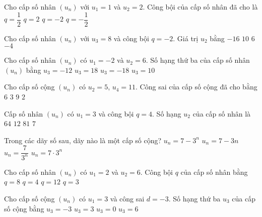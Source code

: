 \begin{ex}
Cho cấp số nhân $(u_n)$ với $u_1=1$ và $u_2=2$. Công bội của cấp số nhân đã cho là
\choice
{$q = \dfrac{1}{2}$}
{\True $q = 2$}
{$q = -2$}
{$q = -\dfrac{1}{2}$}
\end{ex}
\begin{ex}
Cho cấp số nhân $(u_n)$ với $u_3=8$ và công bội $q=-2$. Giá trị $u_2$ bằng
\choice
{$-16$}
{$10$}
{$6$}
{\True $-4$}
\end{ex}
\begin{ex}
Cho cấp số nhân $(u_n)$ có $u_1=-2$ và $u_2=6$. Số hạng thứ ba của cấp số nhân $(u_n)$ bằng
\choice
{$u_3=-12$}
{$u_3=18$}
{\True $u_3=-18$}
{$u_3=10$}
\end{ex}
\begin{ex}
Cho cấp số cộng $(u_n)$ có $u_2=5$, $u_4=11$. Công sai của cấp số cộng đã cho bằng
\choice
{$6$}
{\True $3$}
{$9$}
{$2$}
\end{ex}
\begin{ex}
Cấp số nhân $(u_n)$ có $u_1=3$ và công bội $q=4$. Số hạng $u_2$ của cấp số nhân là
\choice
{$64$}
{\True $12$}
{$81$}
{$7$}
\end{ex}
\begin{ex}
Trong các dãy số sau, dãy nào là một cấp số cộng?
\choice
{$u_n=7-3^n$}
{\True $u_n=7-3n$}
{$u_n=\dfrac{7}{3^n}$}
{$u_n=7 \cdot 3^n$}
\end{ex}
\begin{ex}
Cho cấp số nhân $(u_n)$ có $u_1=2$ và $u_2=6$. Công bội $q$ của cấp số nhân bằng
\choice
{$q=8$}
{$q=4$}
{$q=12$}
{\True $q=3$}
\end{ex}
\begin{ex}
Cho cấp số cộng $(u_n)$ có $u_1=3$ và công sai $d=-3$. Số hạng thứ ba $u_3$ của cấp số cộng bằng
\choice
{\True $u_3=-3$}
{$u_3=3$}
{$u_3=0$}
{$u_3=6$}
\end{ex}
